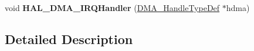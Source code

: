 \begin{DoxyCompactItemize}
\item 
\hypertarget{group___d_m_a___exported___functions___group2_ga8c8564d06f6d39b702af1c5cbb7dd54a}{void {\bfseries H\-A\-L\-\_\-\-D\-M\-A\-\_\-\-I\-R\-Q\-Handler} (\hyperlink{group___d_m_a___exported___types_ga92b907d56a9c29b93d46782a7a04f91e}{D\-M\-A\-\_\-\-Handle\-Type\-Def} $\ast$hdma)}\label{group___d_m_a___exported___functions___group2_ga8c8564d06f6d39b702af1c5cbb7dd54a}

\end{DoxyCompactItemize}


\subsection{Detailed Description}
